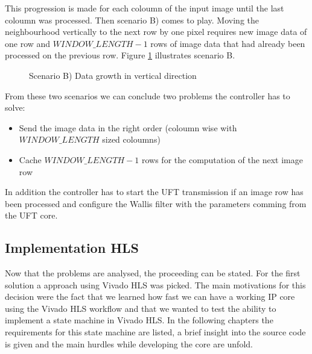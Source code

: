 This progression is made for each coloumn of the input image until the last
coloumn was processed. Then scenario B) comes to play. Moving the neighbourhood
vertically to the next row by one pixel requires new image data of one row
and $WINDOW\_LENGTH-1$ rows of image data that had already been processed on the
previous row. Figure \ref{fig:memproblemgrowthy} illustrates scenario B.

\begin{figure}[H]
    \centering
    \begin{adjustbox}{scale=0.7}
        
    \end{adjustbox}
    \caption{Scenario B) Data growth in vertical direction}
    \label{fig:memproblemgrowthy}
\end{figure}

From these two scenarios we can conclude two problems the controller has to
solve:
\begin{itemize}
    \item Send the image data in the right order (coloumn wise with
    $WINDOW\_LENGTH$ sized coloumns)
    \item Cache $WINDOW\_LENGTH-1$ rows for the computation of the next image
    row
\end{itemize}

In addition the controller has to start the UFT transmission if an image row has
been processed and configure the Wallis filter with the parameters comming from
the UFT core.

\clearpage

\subsection{Implementation HLS} \label{ch:controller:hls}
Now that the problems are analysed, the proceeding can be stated. For the first
solution a approach using Vivado HLS was picked. The main motivations for this
decision were the fact that we learned how fast we can have a working IP core
using the Vivado HLS workflow and that we wanted to test the ability to
implement a state machine in Vivado HLS. In the following chapters the
requirements for this state machine are listed, a brief insight into the source
code is given and the main hurdles while developing the core are unfold.

